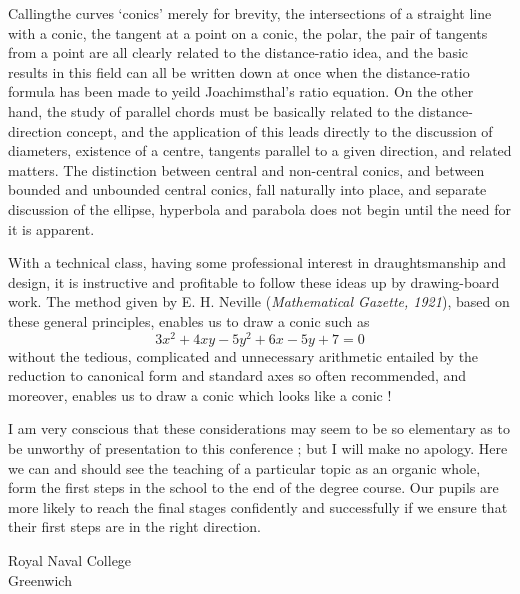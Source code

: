 Calling\pageoriginale the curves `conics' merely for brevity, the intersections of a
straight line with a conic, the tangent at a point on a conic, the
polar, the pair of tangents from a point are all clearly related to
the distance-ratio idea, and the basic results in this field can all
be written down at once when the distance-ratio formula has been made
to yeild Joachimsthal's ratio equation. On the other hand, the study
of parallel chords must be basically related to the distance-direction
concept, and the  application of this leads directly to the discussion
of diameters, existence of a centre, tangents parallel to a given
direction, and related matters. The distinction between central and
non-central conics, and between bounded and unbounded central conics,
fall naturally into place, and separate discussion of the ellipse,
hyperbola and parabola does not begin until the need for it is apparent.

With a technical class, having some professional interest in
draughtsmanship and design, it is instructive and profitable to follow
these ideas up by drawing-board work. The method given by
E. H. Neville (\textit{Mathematical Gazette, 1921}), based on these
general principles, enables us to draw a conic such as 
$$
3x^2 + 4xy - 5y^2 + 6x - 5y + 7 =0 
$$
without the tedious, complicated and unnecessary arithmetic entailed
by the reduction to canonical form and standard axes so often
recommended, and moreover, enables us to draw a conic which looks like
a conic !

I am very conscious that these considerations may seem to be so
elementary as to be unworthy of presentation to this conference ; but
I will make no apology. Here we can and should see the teaching of a
particular topic as an organic whole, form the first steps in the
school to the end of the degree course. Our pupils are more likely to
reach the final stages confidently and successfully if we ensure that
their first steps are in the right direction.

\bigskip
\bigskip

\noindent
{\fontsize{9pt}{11pt}\selectfont
Royal Naval College\\
Greenwich}\relax
